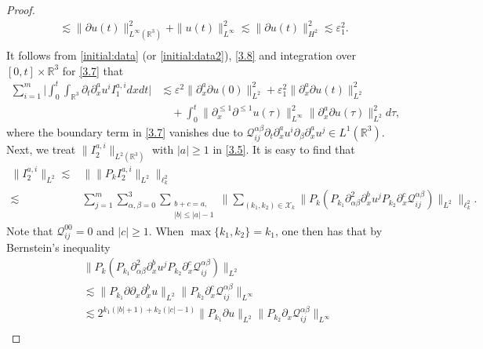 \documentclass[10pt,a4paper]{amsart}
\def\cQ{\mathcal Q}
\def\ls{\lesssim}
\def\p{\partial}
\def\ve{\varepsilon}
\begin{document}
\begin{proof}
\begin{equation}
\begin{aligned}
			\ls
			\|\partial u(t)\|_{L^\infty(\mathbb{R}^3)}^2 +\|u(t)\|_{L^\infty}^2
			\ls
			\|\partial u(t)\|_{H^2}^2
			\ls \ve_1^2.\\
		\end{aligned}
	\end{equation}
	It follows from \eqref{initial:data} (or \eqref{initial:data2}), \eqref{3.8} and integration over $[0,t] \times \mathbb{R}^3$
for \eqref{3.7} that
	\begin{equation*}
		\begin{aligned}
		\sum_{i=1}^{m}\big| \int_0^t \int_{\mathbb{R}^3} \partial_t \partial_x^a u^i I_1^{a,i} dx dt\big|
        &\lesssim \ve^2\|\partial_x^a\partial  u(0)\|_{L^2}^2 + \ve^2_1\|\partial_x^a\partial  u(t)\|_{L^2}^2 \\
		&\quad + \int_0^t  \|\partial_x^{\le 1}\partial^{\le 1}  u(\tau)\|_{L^\infty}^2 \|\partial_x^a\partial  u(\tau)\|_{L^2}^2 d\tau,
		\end{aligned}	
	\end{equation*}
	where the boundary term in \eqref{3.7} vanishes due to $\cQ^{\alpha\beta}_{ij}\partial_t \partial_x^a u^i \partial_\beta \partial_x^a u^j  \in L^1(\mathbb{R}^3)$.\\
	Next, we treat $\|I_2^{a,i}\|_{L^2(\mathbb{R}^3)}$ with $|a| \geq 1$ in \eqref{3.5}.
It is easy to find that
	\begin{equation*}
		\begin{aligned}
			\|I_2^{a,i}\|_{L^2}
			\lesssim& \big\| \|P_k I_2^{a,i}\|_{L^2}\big\|_{\ell_k^2} \\
			\lesssim& \sum_{j=1}^m\sum_{\alpha,\beta=0}^3\sum_{\substack{b+c=a, \\ |b| \leq |a|-1}} \big\| \sum_{(k_1,k_2) \in \mathcal{X}_k} \| P_k(P_{k_1} \partial_{\alpha\beta}^2 \partial_x^b u^j P_{k_2} \p_x^c\cQ^{\alpha\beta}_{ij} )\|_{L^2} \big\|_{\ell_k^2}.
		\end{aligned}
	\end{equation*}
Note that $\mathcal{Q}^{00}_{ij}=0$ and $|c|\ge 1$. When $\max\{k_1, k_2\} = k_1$, one then has that by Bernstein's inequality
	\begin{equation*}
		\begin{aligned}
			&\|P_k(P_{k_1} \partial_{\alpha\beta}^2 \partial_x^b u^j P_{k_2} \p_x^c\cQ^{\alpha\beta}_{ij} )\|_{L^2}\\
			&\lesssim \|P_{k_1} \partial\partial_x \partial_x^b u\|_{L^2} \|P_{k_2} \p_x^c\cQ^{\alpha\beta}_{ij} \|_{L^\infty} \\
			&\lesssim 2^{k_1(|b|+1)+k_2(|c|-1)} \|P_{k_1} \partial u\|_{L^2} \|P_{k_2}\p_x \cQ^{\alpha\beta}_{ij}\|_{L^\infty}  \\

\end{aligned}
\end{equation*}
\end{proof}
\end{document}
